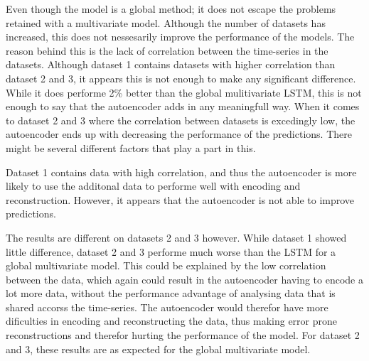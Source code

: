 Even though the model is a global method; it does not escape the problems retained with a multivariate model.
Although the number of datasets has increased, this does not nessesarily improve the performance of the models.
The reason behind this is the lack of correlation between the time-series in the datasets.
Although dataset 1 contains datasets with higher correlation than dataset 2 and 3, it appears this is not enough to make any significant difference.
While it does performe 2\% better than the global mulitivariate LSTM, this is not enough to say that the autoencoder adds
in any meaningfull way.
When it comes to dataset 2 and 3 where the correlation between datasets is excedingly low, the autoencoder ends up with decreasing the performance of the predictions.
There might be several different factors that play a part in this.

Dataset 1 contains data with high correlation, and thus the autoencoder is more likely to use the additonal data to performe well with encoding and reconstruction.
However, it appears that the autoencoder is not able to improve predictions.


The results are different on datasets 2 and 3 however.
While dataset 1 showed little difference, dataset 2 and 3 performe much worse than the LSTM for a global multivariate model.
This could be explained by the low correlation between the data, which again could result in the autoencoder having to encode a lot more data,
without the performance advantage of analysing data that is shared accorss the time-series.
The autoencoder would therefor have more dificulties in encoding and reconstructing the data,
thus making error prone reconstructions and therefor hurting the performance of the model.
For dataset 2 and 3, these results are as expected for the global multivariate model.


















